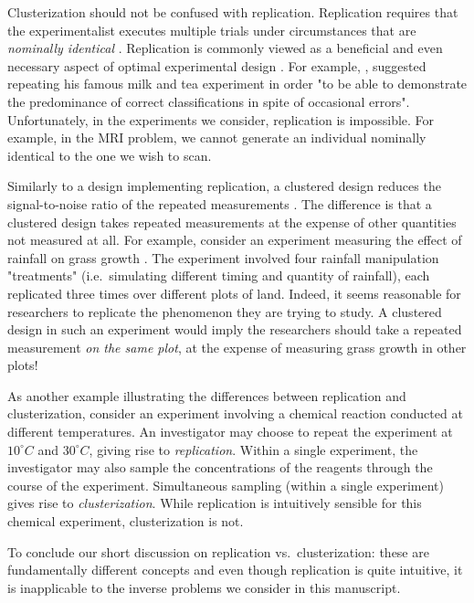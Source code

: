 Clusterization should not be confused with replication. Replication
requires that the experimentalist executes multiple trials under
circumstances that are \emph{nominally identical} \citet[Section
  1.2.4]{morris2011}. Replication is commonly viewed as a beneficial
and even necessary aspect of optimal experimental design
\citet{fisher1949design, morris2011, schafer2001replication}.
For example, \citet{fisher1949design}, suggested repeating his famous
milk and tea experiment in order "to be able to demonstrate the
predominance of correct classifications in spite of occasional
errors". Unfortunately, in the experiments we consider, replication is
impossible. For example, in the MRI problem, we cannot generate an
individual nominally identical to the one we wish to scan.

Similarly to a design implementing replication, a clustered design
reduces the signal-to-noise ratio of the repeated measurements
\citet{telford2007brief}. The difference is that a clustered design
takes repeated measurements at the expense of other quantities not
measured at all. For example, consider an experiment measuring the
effect of rainfall on grass growth \citet{fay2000rainfall}. The
experiment involved four rainfall manipulation "treatments"
(i.e.~simulating different timing and quantity of rainfall), each
replicated three times over different plots of land. Indeed, it seems
reasonable for researchers to replicate the phenomenon they are trying
to study. A clustered design in such an experiment would imply the
researchers should take a repeated measurement \emph{on the same
plot}, at the expense of measuring grass growth in other plots!

As another example illustrating the differences between replication
and clusterization, consider an experiment involving a chemical
reaction conducted at different temperatures. An investigator may
choose to repeat the experiment at $10^\circ C$ and $30^\circ C$,
giving rise to \emph{replication}. Within a single experiment, the
investigator may also sample the concentrations of the reagents
through the course of the experiment. Simultaneous sampling (within a
single experiment) gives rise to \emph{clusterization}. While
replication is intuitively sensible for this chemical experiment,
clusterization is not.

To conclude our short discussion on replication vs.~clusterization:
these are fundamentally different concepts and even though replication
is quite intuitive, it is inapplicable to the inverse problems we
consider in this manuscript.

